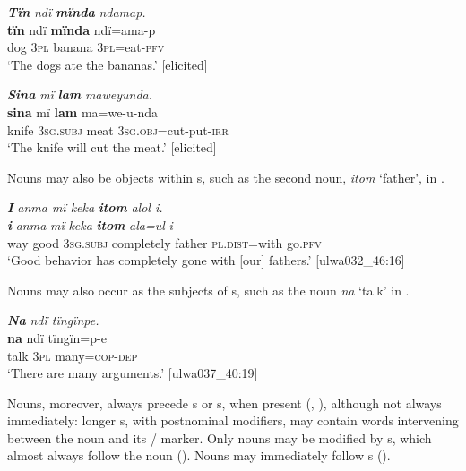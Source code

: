 \ea%
    \label{ex:nouns:7}
            \textbf{\textit{Tïn}} \textit{ndï} \textbf{\textit{mïnda}} \textit{ndamap.}\\
    \gll \textbf{tïn}    ndï  \textbf{mïnda}  ndï=ama-p\\
    dog  3\textsc{pl}  banana  3\textsc{pl=}eat-\textsc{pfv}\\
\glt `The dogs ate the bananas.’ [elicited]
\z

\ea%
    \label{ex:nouns:8}
            \textbf{\textit{Sina}} \textit{mï} \textbf{\textit{lam}} \textit{maweyunda.}\\
    \gll \textbf{sina}  mï      \textbf{lam}  ma=we-u-nda\\
    knife  \textsc{3sg.subj}  meat  \textsc{3sg.obj}=cut-put-\textsc{irr}\\
\glt `The knife will cut the meat.’ [elicited]
\z

Nouns may also be objects within s, such as the second noun, \textit{itom} ‘father’, in .

\ea%
    \label{ex:nouns:9}
            \textbf{\textit{I}} \textit{anma mï keka} \textbf{\textit{itom}} \textit{alol i.}\\
    \gll \textbf{\textit{i}} \textit{anma}  \textit{mï}       \textit{keka} \textbf{\textit{itom}} \textit{ala=ul} \textit{i}\\
    way  good  3\textsc{sg.subj}  completely  father  \textsc{pl.dist}=with go.\textsc{pfv}\\
\glt `Good behavior has completely gone with [our] fathers.’ [ulwa032\_46:16]
\z

Nouns may also occur as the subjects of s, such as the noun \textit{na} ‘talk’ in .

\ea%
    \label{ex:nouns:10}
            \textbf{\textit{Na}} \textit{ndï tïngïnpe.}\\
\gll  \textbf{na}    ndï  tïngïn=p-e\\
    talk  3\textsc{pl}  many=\textsc{cop-dep}\\
\glt `There are many arguments.’ [ulwa037\_40:19]
\z

  Nouns, moreover, always precede s or s, when present (, ), although not always immediately: longer s, with postnominal modifiers, may contain words intervening between the noun and its / marker. Only nouns may be modified by s, which almost always follow the noun (). Nouns may immediately follow s ().
  
